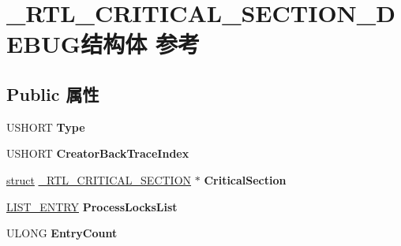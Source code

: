 \hypertarget{struct___r_t_l___c_r_i_t_i_c_a_l___s_e_c_t_i_o_n___d_e_b_u_g}{}\section{\+\_\+\+R\+T\+L\+\_\+\+C\+R\+I\+T\+I\+C\+A\+L\+\_\+\+S\+E\+C\+T\+I\+O\+N\+\_\+\+D\+E\+B\+U\+G结构体 参考}
\label{struct___r_t_l___c_r_i_t_i_c_a_l___s_e_c_t_i_o_n___d_e_b_u_g}
\subsection*{Public 属性}
\begin{DoxyCompactItemize}
\item 
\mbox{\label{struct___r_t_l___c_r_i_t_i_c_a_l___s_e_c_t_i_o_n___d_e_b_u_g_a559c1d3f408290bd15d3338bcf5e796c}} 
U\+S\+H\+O\+RT {\bfseries Type}
\item 
\mbox{\label{struct___r_t_l___c_r_i_t_i_c_a_l___s_e_c_t_i_o_n___d_e_b_u_g_a87a5fe512e44645dc7325ffc7b38a074}} 
U\+S\+H\+O\+RT {\bfseries Creator\+Back\+Trace\+Index}
\item 
\mbox{\label{struct___r_t_l___c_r_i_t_i_c_a_l___s_e_c_t_i_o_n___d_e_b_u_g_a37e5902ae4aaf538f2bfcc201c990fbf}} 
\hyperlink{interfacestruct}{struct} \hyperlink{struct___r_t_l___c_r_i_t_i_c_a_l___s_e_c_t_i_o_n}{\+\_\+\+R\+T\+L\+\_\+\+C\+R\+I\+T\+I\+C\+A\+L\+\_\+\+S\+E\+C\+T\+I\+ON} $\ast$ {\bfseries Critical\+Section}
\item 
\mbox{\label{struct___r_t_l___c_r_i_t_i_c_a_l___s_e_c_t_i_o_n___d_e_b_u_g_a2cf10eb33b3f13683d87980cd61a70a1}} 
\hyperlink{struct___l_i_s_t___e_n_t_r_y}{L\+I\+S\+T\+\_\+\+E\+N\+T\+RY} {\bfseries Process\+Locks\+List}
\item 
\mbox{\label{struct___r_t_l___c_r_i_t_i_c_a_l___s_e_c_t_i_o_n___d_e_b_u_g_a33dd673ec457483b47521df4cbf77a4c}} 
U\+L\+O\+NG {\bfseries Entry\+Count}

\end{DoxyCompactItemize}
